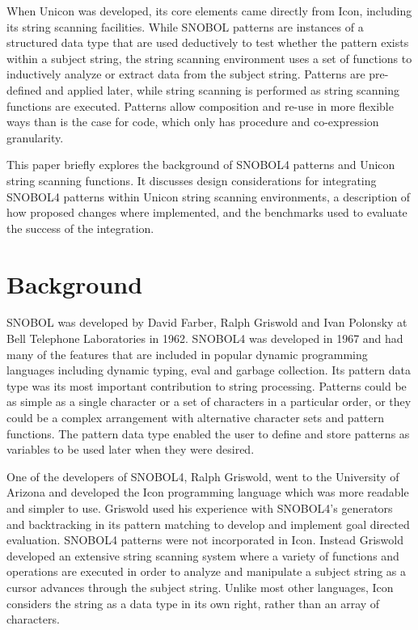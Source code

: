 \documentclass{article}
\begin{document}
When Unicon was developed, its core elements came directly from Icon, including its string scanning facilities.\cite{JefferyUnicon}  While SNOBOL patterns are instances of a structured data type that are used deductively to test whether the pattern exists within a subject string, the string scanning environment uses a set of functions to inductively analyze or extract data from the subject string.  Patterns are pre-defined and applied later, while string scanning is performed as string scanning functions are executed.  Patterns allow composition and re-use in more flexible ways than is the case for code, which only has procedure and co-expression granularity.

This paper briefly explores the background of SNOBOL4 patterns and Unicon string scanning functions.  It discusses design considerations for integrating SNOBOL4 patterns within Unicon string scanning environments, a description of how proposed changes where implemented, and the benchmarks used to evaluate the success of the integration.

\section{Background}
SNOBOL was developed by David Farber, Ralph Griswold and Ivan Polonsky at Bell Telephone Laboratories in 1962.  SNOBOL4 was developed in 1967 and had many of the features that are included in popular dynamic programming languages including dynamic typing, eval and garbage collection.  Its pattern data type was its most important contribution to string processing.  Patterns could be as simple as a single character or a set of characters in a particular order, or they could be a complex arrangement with alternative character sets and pattern functions.  The pattern data type enabled the user to define and store patterns as variables to be used later when they were desired.\cite{Snobol}  

One of the developers of SNOBOL4, Ralph Griswold, went to the University of Arizona and developed the Icon programming language which was more readable and simpler to use.\cite{JefferyUnicon}  Griswold used his experience with SNOBOL4's generators and backtracking in its pattern matching to develop and implement goal directed evaluation.\cite{Gaikaiwari2005}  SNOBOL4 patterns were not incorporated in Icon.  Instead Griswold developed an extensive string scanning system where a variety of functions and operations are executed in order to analyze and manipulate a subject string as a cursor advances through the subject string.  Unlike most other languages, Icon considers the string as a data type in its own right, rather than an array of characters. \cite{GriswoldIcon}  
\end{document}
